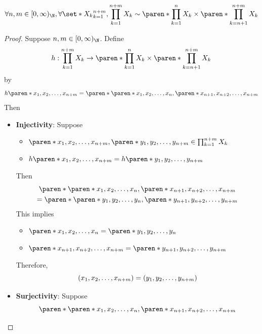 \begin{lemma} \label{an1:lem:separated-product-is-similar-to-original-product}
  \[
    \forall n, m \in [0, \infty)_{\N}, \forall \set*{X_{k}}_{k = 1}^{n + m}, \prod_{k = 1}^{n + m} X_{k}
    \sim \paren*{\prod_{k = 1}^{n} X_{k}} \times \paren*{\prod_{k = n + 1}^{n + m} X_{k}}
  \]
\end{lemma}

\begin{proof}
  Suppose $n, m \in [0, \infty)_{\N}$. Define
  \[
    h: \prod_{k = 1}^{n + m} X_{k} \to
    \paren*{\prod_{k = 1}^{n} X_{k}} \times \paren*{\prod_{k = n + 1}^{n + m} X_{k}}
  \]
  by
  \[
    h\paren*{x_{1}, x_{2}, \ldots, x_{n + m}} =
    \paren*{\paren*{x_{1}, x_{2}, \ldots, x_{n}}, \paren*{x_{n + 1}, x_{n + 2}, \ldots, x_{n + m}}}
  \]
  Then
  \begin{itemize}
    \item \textbf{Injectivity}: Suppose
          \begin{itemize}
            \item $\paren*{x_{1}, x_{2}, \ldots, x_{n + m}},
                    \paren*{y_{1}, y_{2}, \ldots, y_{n + m}} \in \prod_{k = 1}^{n + m} X_{k}$
            \item $h\paren*{x_{1}, x_{2}, \ldots, x_{n + m}} = h\paren*{y_{1}, y_{2}, \ldots, y_{n + m}}$
          \end{itemize}
          Then
          \[
            \begin{gathered}
              \paren*{\paren*{x_{1}, x_{2}, \ldots, x_{n}}, \paren*{x_{n + 1}, x_{n + 2}, \ldots, x_{n + m}}} \\
              = \paren*{\paren*{y_{1}, y_{2}, \ldots, y_{n}}, \paren*{y_{n + 1}, y_{n + 2}, \ldots, y_{n + m}}}
            \end{gathered}
          \]
          This implies
          \begin{itemize}
            \item $\paren*{x_{1}, x_{2}, \ldots, x_{n}} = \paren*{y_{1}, y_{2}, \ldots, y_{n}}$
            \item $\paren*{x_{n + 1}, x_{n + 2}, \ldots, x_{n + m}} = \paren*{y_{n + 1}, y_{n + 2}, \ldots, y_{n + m}}$
          \end{itemize}
          Therefore,
          \[
            (x_{1}, x_{2}, \ldots, x_{n + m}) = (y_{1}, y_{2}, \ldots, y_{n + m}) \\
          \]
    \item \textbf{Surjectivity}: Suppose
          \[
            \paren*{\paren*{x_{1}, x_{2}, \ldots, x_{n}}, \paren*{x_{n + 1}, x_{n + 2}, \ldots, x_{n + m}}}
\]
\end{itemize}
\end{proof}
